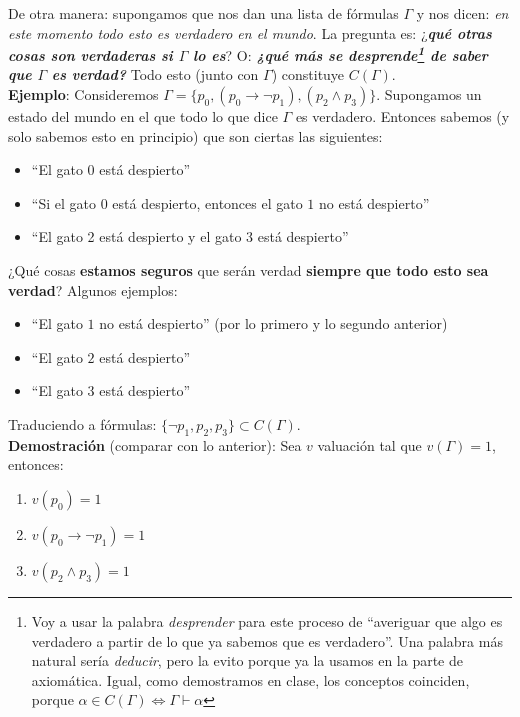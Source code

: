 \documentclass[10pt,a4paper]{article}
\newcommand{\G}{\Gamma}
\newcommand{\ra}{\rightarrow}
\renewcommand{\a}{\alpha}
\begin{document}
De otra manera: supongamos que nos dan una lista de fórmulas $\G$ y nos dicen: \textit{en este momento todo esto es verdadero en el mundo}. La pregunta es: ¿\textit{\textbf{qué otras cosas son verdaderas si $\G$ lo es}}? O: \textit{\textbf{¿qué más se desprende\footnote{Voy a usar la palabra \textit{desprender} para este proceso de ``averiguar que algo es verdadero a partir de lo que ya sabemos que es verdadero''. Una palabra más natural sería \textit{deducir}, pero la evito porque ya la usamos en la parte de axiomática. Igual, como demostramos en clase, los conceptos coinciden, porque $\a \in C(\G) \iff \G \vdash \a$} de saber que $\G$ es verdad?}} Todo esto (junto con $\G$) constituye $C(\G)$.\\


\textbf{Ejemplo}: Consideremos $\G = \{ p_0, (p_0 \ra \neg p_1), (p_2 \land p_3) \}$. Supongamos un estado del mundo en el que todo lo que dice $\G$ es verdadero. Entonces sabemos (y solo sabemos esto en principio) que son ciertas las siguientes:

\begin{itemize}
\item ``El gato $0$ está despierto''
\item ``Si el gato $0$ está despierto, entonces el gato $1$ no está despierto''
\item ``El gato 2 está despierto y el gato 3 está despierto''
\end{itemize}

¿Qué cosas \textbf{estamos seguros} que serán verdad \textbf{siempre que todo esto sea verdad}? Algunos ejemplos:

\begin{itemize}
\item ``El gato $1$ no está despierto'' (por lo primero y lo segundo anterior)
\item ``El gato $2$ está despierto''
\item ``El gato $3$ está despierto''
\end{itemize}
 
Traduciendo a fórmulas: $\{ \neg p_1, p_2, p_3 \} \subset C(\G)$.\\

\textbf{Demostración} (comparar con lo anterior): Sea $v$ valuación tal que $v(\G) = 1$, entonces:

\begin{enumerate}
\item $v(p_0) = 1$
\item $v(p_0 \ra \neg p_1) = 1$
\item $v(p_2 \land p_3) = 1$
\end{enumerate}
\end{document}
